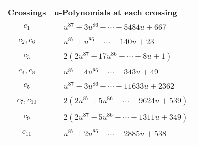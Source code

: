 \documentclass[1p]{elsarticle_modified}
\theoremstyle{definition}
\begin{document}
\begin{tabular}{m{50pt}|m{274pt}}
Crossings & \hspace{64pt}u-Polynomials at each crossing \\
\hline $$\begin{aligned}c_{1}\end{aligned}$$&$\begin{aligned}
&u^{87}+3 u^{86}+\cdots-5484 u+667
\end{aligned}$\\
\hline $$\begin{aligned}c_{2},c_{6}\end{aligned}$$&$\begin{aligned}
&u^{87}+u^{86}+\cdots-140 u+23
\end{aligned}$\\
\hline $$\begin{aligned}c_{3}\end{aligned}$$&$\begin{aligned}
&2(2 u^{87}-17 u^{86}+\cdots-8 u+1)
\end{aligned}$\\
\hline $$\begin{aligned}c_{4},c_{8}\end{aligned}$$&$\begin{aligned}
&u^{87}-4 u^{86}+\cdots+343 u+49
\end{aligned}$\\
\hline $$\begin{aligned}c_{5}\end{aligned}$$&$\begin{aligned}
&u^{87}-3 u^{86}+\cdots+11633 u+2362
\end{aligned}$\\
\hline $$\begin{aligned}c_{7},c_{10}\end{aligned}$$&$\begin{aligned}
&2(2 u^{87}+5 u^{86}+\cdots+9624 u+539)
\end{aligned}$\\
\hline $$\begin{aligned}c_{9}\end{aligned}$$&$\begin{aligned}
&2(2 u^{87}-5 u^{86}+\cdots+1311 u+349)
\end{aligned}$\\
\hline $$\begin{aligned}c_{11}\end{aligned}$$&$\begin{aligned}
&u^{87}+2 u^{86}+\cdots+2885 u+538
\end{aligned}$\\
\hline
\end{tabular}\\~\\
\end{document}
